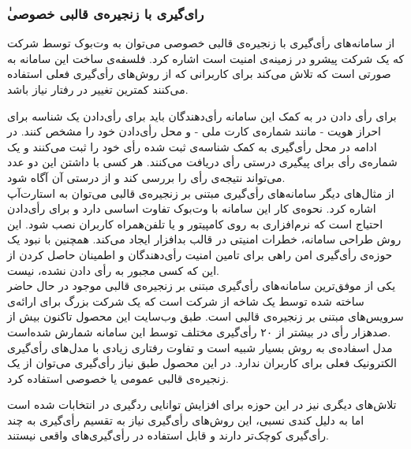 \subsubsection{ٰرای‌گیری با زنجیره‌ی قالبی خصوصی}
از سامانه‌های رأی‌گیری با زنجیره‌ی قالبی خصوصی می‌توان به وت‌بوک
\cite{votebook}
توسط شرکت 
که یک شرکت پیشرو در زمینه‌ی امنیت است اشاره کرد. فلسفه‌ی ساخت این سامانه به صورتی است که تلاش می‌کند برای کاربرانی که از روش‌های رأی‌گیری فعلی استفاده می‌کنند کمترین تغییر در رفتار نیاز باشد.
\par 
 برای رأی دادن در به کمک این سامانه رأی‌دهندگان باید برای رأی‌دادن یک شناسه‌ برای احراز هویت - مانند شماره‌ی کارت ملی - و محل رأی‌دادن خود را مشخص کنند. در ادامه در محل رأی‌گیری به کمک شناسه‌ی ثبت شده رأی خود را ثبت می‌کنند و یک شماره‌ی رأی برای پیگیری درستی رأی دریافت می‌کنند. هر کسی با داشتن این دو عدد می‌تواند نتیجه‌ی رأی را بررسی کند و از درستی آن آگاه شود. 
\\
از مثال‌های دیگر سامانه‌های رأی‌گیری مبتنی بر زنجیره‌ی قالبی می‌توان به استارت‌آپ 
اشاره کرد. نحوه‌ی کار این سامانه با  
وت‌بوک
تفاوت اساسی دارد و برای رأی‌دادن احتیاج است که نرم‌‌افزاری به روی کامپیتور و یا تلفن‌همراه کاربران نصب شود. این روش طراحی سامانه،‌ خطرات امنیتی در قالب بدافزار ایجاد می‌کند. همچنین با نبود یک حوزه‌ی رأی‌گیری امن راهی برای تامین امنیت رأی‌دهندگان و اطمینان حاصل کردن از این که کسی مجبور به رأی‌ دادن نشده، نیست.
\\
یکی از موفق‌ترین سامانه‌های رأی‌گیری مبتنی بر زنجیره‌ی قالبی موجود در حال حاضر 
ساخته شده توسط یک شاخه از شرکت 
است که یک شرکت بزرگ برای ارائه‌ی سرویس‌های مبتنی بر زنجیره‌ی قالبی است. طبق وب‌سایت این محصول تاکنون بیش از صدهزار رأی در بیشتر از ۲۰ رأی‌گیری مختلف توسط این سامانه‌ شمارش شده‌است. 
\\
مدل اسفاده‌ی 
به روش‌ 
بسیار شبیه است و تفاوت رفتاری زیادی با مدل‌های رأی‌گیری الکترونیک فعلی برای کاربران ندارد. در این محصول طبق نیاز رأی‌گیری می‌توان از یک زنجیره‌ی قالبی عمومی یا خصوصی استفاده کرد.
\par
تلاش‌های دیگری نیز در این حوزه برای افزایش توانایی ردگیری در انتخابات شده است
\cite{privblock}
اما به دلیل کندی نسبی، این روش‌های رأی‌گیری نیاز به تقسیم رأی‌گیری به چند رأی‌گیری کوچک‌تر دارند و قابل استفاده در رأی‌گیری‌های واقعی نیستند.


